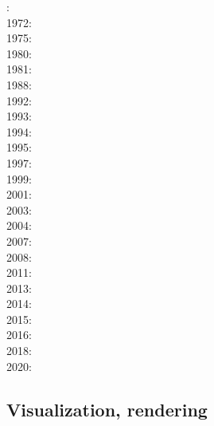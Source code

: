 {\scriptsize
{}: \cite{ramb68}\\
1972: \cite{bers72}\\
1975: \cite{dixo75}\\
1980: \cite{ramb80}\\
1981: \cite{brpo81}\\
1988: \cite{sccm88}\\
1992: \cite{vayv92}\cite{zaju92}\cite{wein92}\cite{wesc92}\cite{veja92}\cite{pepp92}\\
1993: \cite{kesb93}\cite{nabr93}\cite{potp93}\cite{povp93}\cite{vasv93}\cite{pocp93}
      \cite{popt93}\cite{wein93}\cite{vayv93}\\
1994: \cite{wepo94}\\
1995: \cite{wepo95}\cite{bisc95}\cite{wepo95}\cite{crks95}\\
1997: \cite{wein97}\\
1999: \cite{drdv99}\\
2001: \cite{kapo01}\cite{drvc01}\\
2003: \cite{geur03}\cite{vavd03}\\
2004: \cite{gepm04}\cite{istt04}\cite{geur04}\\
2007: \cite{gebu07}\\
2008: \cite{buge08}\cite{zlfd08}\cite{mohc98}\\
2011: \cite{ellw11}\cite{pege11}\\
2013: \cite{fusc13}\\
2014: \cite{feka14b}\\
2015: \cite{feka15}\cite{fuks15}\\
2016: \cite{cakp16}\\
2018: \cite{gesr18}\\
2020: \cite{logb20}
}

\subsection{Visualization, rendering}

{\scriptsize
\noindent
\cite{faha}
\cite{rugy04}
\cite{chzy08}\cite{stmt08}\cite{bikh08}
\cite{may12}
\cite{cram18}
}

